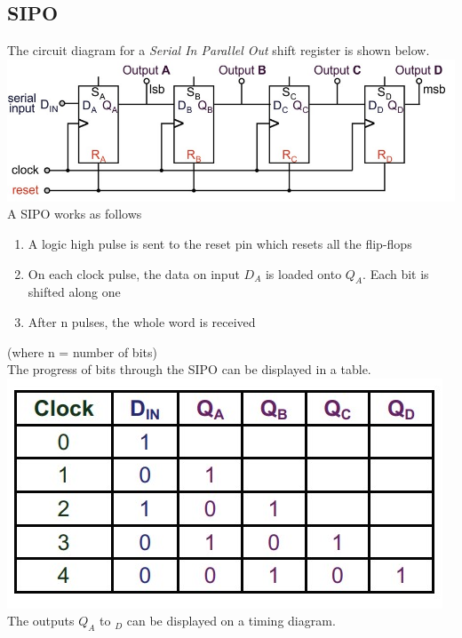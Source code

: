 \documentclass[a4paper,11pt, twocolumn]{article}
\begin{document}
\subsection{SIPO}
The circuit diagram for a \textit{Serial In Parallel Out} shift register is shown below.
\includegraphics[width=\linewidth]{sipo.jpg}
A SIPO works as follows
\begin{enumerate}
    \item A logic high pulse is sent to the reset pin which resets all the flip-flops
    \item On each clock pulse, the data on input $D_A$ is loaded onto $Q_A$. Each bit is shifted along one
    \item After n pulses, the whole word is received
\end{enumerate}
(where n = number of bits)\\
The progress of bits through the SIPO can be displayed in a table.
\includegraphics[width=\linewidth]{sipoTable.jpg}
The outputs $Q_A$ to $_D$ can be displayed on a timing diagram.
\end{document}
